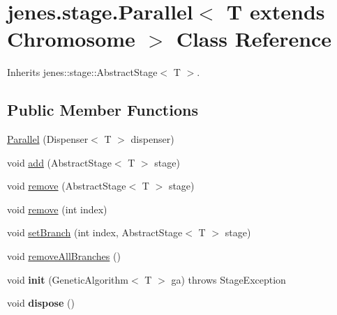 \hypertarget{classjenes_1_1stage_1_1_parallel_3_01_t_01extends_01_chromosome_01_4}{
\section{jenes.stage.Parallel$<$ T extends Chromosome $>$ Class Reference}
\label{classjenes_1_1stage_1_1_parallel_3_01_t_01extends_01_chromosome_01_4}
}
Inherits jenes::stage::AbstractStage$<$ T $>$.

\subsection*{Public Member Functions}
\begin{CompactItemize}
\item 
\hyperlink{classjenes_1_1stage_1_1_parallel_3_01_t_01extends_01_chromosome_01_4_933c7a845f624f290f27c9921e6e8ca9}{Parallel} (Dispenser$<$ T $>$ dispenser)
\item 
void \hyperlink{classjenes_1_1stage_1_1_parallel_3_01_t_01extends_01_chromosome_01_4_fe3cf6bd36f7e0f7246cbf609d9cbdf2}{add} (AbstractStage$<$ T $>$ stage)
\item 
void \hyperlink{classjenes_1_1stage_1_1_parallel_3_01_t_01extends_01_chromosome_01_4_db15ae336a8829eb0a8f984eb7aac3ca}{remove} (AbstractStage$<$ T $>$ stage)
\item 
void \hyperlink{classjenes_1_1stage_1_1_parallel_3_01_t_01extends_01_chromosome_01_4_cf777ee17edc34cb81d2d0fc145cffc4}{remove} (int index)
\item 
void \hyperlink{classjenes_1_1stage_1_1_parallel_3_01_t_01extends_01_chromosome_01_4_115d20da27789c0a053ed7e161838477}{setBranch} (int index, AbstractStage$<$ T $>$ stage)
\item 
void \hyperlink{classjenes_1_1stage_1_1_parallel_3_01_t_01extends_01_chromosome_01_4_cc2efb924520eb73061928e39580202c}{removeAllBranches} ()
\item 
\hypertarget{classjenes_1_1stage_1_1_parallel_3_01_t_01extends_01_chromosome_01_4_75d99b7406d735b297e6192b2ac130e9}{
void \textbf{init} (GeneticAlgorithm$<$ T $>$ ga)  throws StageException }
\label{classjenes_1_1stage_1_1_parallel_3_01_t_01extends_01_chromosome_01_4_75d99b7406d735b297e6192b2ac130e9}

\item 
\hypertarget{classjenes_1_1stage_1_1_parallel_3_01_t_01extends_01_chromosome_01_4_67831e08edd3b98bf0d81778cf067aeb}{
void \textbf{dispose} ()}
\label{classjenes_1_1stage_1_1_parallel_3_01_t_01extends_01_chromosome_01_4_67831e08edd3b98bf0d81778cf067aeb}


\end{CompactItemize}
